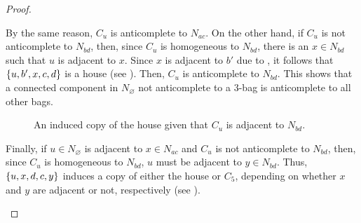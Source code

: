 \begin{proof}
\begin{enumerate}[label=(\roman*)]
            \noindent
            By the same reason, $C_u$ is anticomplete to $N_{ac}$. On the other
            hand, if $C_u$ is not anticomplete to $N_{bd}$, then, since $C_u$ is
            homogeneous to $N_{bd}$, there is an $x\in N_{bd}$ such that $u$ is
            adjacent to $x$. Since $x$ is adjacent to $b'$ due to
            , it follows that $\left\{u,b',x,c,d\right\}$ is a house (see
            ). Then, $C_u$ is anticomplete to $N_{bd}$. This
            shows that a connected component in $N_{\varnothing}$ not
            anticomplete to a $3$-bag is anticomplete to all other bags.
            \begin{figure}[htb!]
                \centering
                \caption{An induced copy of the house given that $C_u$ is
                    adjacent to $N_{bd}$.}
                \label{fig:type_8_3}
            \end{figure}

            Finally, if $u\in N_{\varnothing}$ is adjacent to $x\in N_{ac}$ and
            $C_u$ is not anticomplete to $N_{bd}$, then, since $C_u$ is
            homogeneous to $N_{bd}$, $u$ must be adjacent to $y\in N_{bd}$.
            Thus, $\left\{u,x,d,c,y\right\}$ induces a copy of either the house or $C_5$,
            depending on whether $x$ and $y$ are adjacent or not, respectively
            (see ).


\end{enumerate}
\end{proof}
